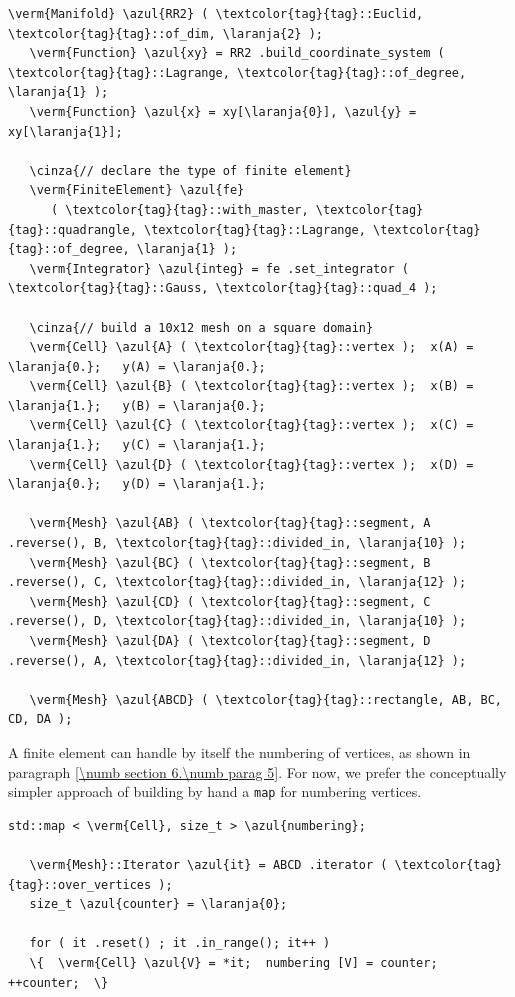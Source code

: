 \begin{Verbatim}[commandchars=\\\{\},formatcom=\small\tt,frame=single,
   label=parag-\ref{\numb section 6.\numb parag 3}.cpp,rulecolor=\color{moldura},
   baselinestretch=0.94,framesep=2mm                                            ]
   \verm{Manifold} \azul{RR2} ( \textcolor{tag}{tag}::Euclid, \textcolor{tag}{tag}::of_dim, \laranja{2} );
   \verm{Function} \azul{xy} = RR2 .build_coordinate_system ( \textcolor{tag}{tag}::Lagrange, \textcolor{tag}{tag}::of_degree, \laranja{1} );
   \verm{Function} \azul{x} = xy[\laranja{0}], \azul{y} = xy[\laranja{1}];

   \cinza{// declare the type of finite element}
   \verm{FiniteElement} \azul{fe}
      ( \textcolor{tag}{tag}::with_master, \textcolor{tag}{tag}::quadrangle, \textcolor{tag}{tag}::Lagrange, \textcolor{tag}{tag}::of_degree, \laranja{1} );
   \verm{Integrator} \azul{integ} = fe .set_integrator ( \textcolor{tag}{tag}::Gauss, \textcolor{tag}{tag}::quad_4 );

   \cinza{// build a 10x12 mesh on a square domain}
   \verm{Cell} \azul{A} ( \textcolor{tag}{tag}::vertex );  x(A) = \laranja{0.};   y(A) = \laranja{0.};
   \verm{Cell} \azul{B} ( \textcolor{tag}{tag}::vertex );  x(B) = \laranja{1.};   y(B) = \laranja{0.};
   \verm{Cell} \azul{C} ( \textcolor{tag}{tag}::vertex );  x(C) = \laranja{1.};   y(C) = \laranja{1.};
   \verm{Cell} \azul{D} ( \textcolor{tag}{tag}::vertex );  x(D) = \laranja{0.};   y(D) = \laranja{1.};

   \verm{Mesh} \azul{AB} ( \textcolor{tag}{tag}::segment, A .reverse(), B, \textcolor{tag}{tag}::divided_in, \laranja{10} );
   \verm{Mesh} \azul{BC} ( \textcolor{tag}{tag}::segment, B .reverse(), C, \textcolor{tag}{tag}::divided_in, \laranja{12} );
   \verm{Mesh} \azul{CD} ( \textcolor{tag}{tag}::segment, C .reverse(), D, \textcolor{tag}{tag}::divided_in, \laranja{10} );
   \verm{Mesh} \azul{DA} ( \textcolor{tag}{tag}::segment, D .reverse(), A, \textcolor{tag}{tag}::divided_in, \laranja{12} );

   \verm{Mesh} \azul{ABCD} ( \textcolor{tag}{tag}::rectangle, AB, BC, CD, DA );
\end{Verbatim}

A finite element can handle by itself the numbering of vertices, as shown in paragraph
\ref{\numb section 6.\numb parag 5}.
For now, we prefer the conceptually simpler approach of building by hand a {\small\tt map}
for numbering vertices.

\begin{Verbatim}[commandchars=\\\{\},formatcom=\small\tt,frame=single,
   label=parag-\ref{\numb section 6.\numb parag 3}.cpp,rulecolor=\color{moldura},
   baselinestretch=0.94,framesep=2mm                                            ]
   std::map < \verm{Cell}, size_t > \azul{numbering};

   \verm{Mesh}::Iterator \azul{it} = ABCD .iterator ( \textcolor{tag}{tag}::over_vertices );
   size_t \azul{counter} = \laranja{0};

   for ( it .reset() ; it .in_range(); it++ )
   \{  \verm{Cell} \azul{V} = *it;  numbering [V] = counter;  ++counter;  \}
\end{Verbatim}

